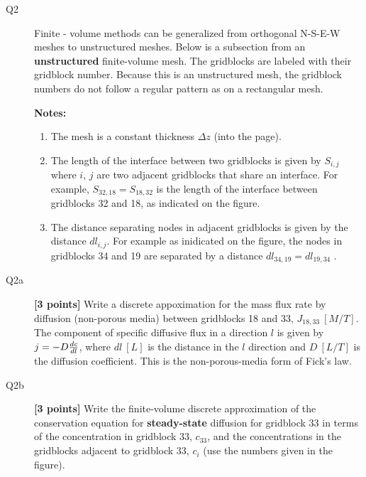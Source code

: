 \documentclass{article}
\begin{document}

\begin{description}
\item [Q2] Finite - volume methods can be generalized from orthogonal N-S-E-W meshes to unstructured meshes. Below is a subsection from an \textbf{unstructured} finite-volume mesh. The gridblocks are labeled with their gridblock number. Because this is an unstructured mesh, the gridblock numbers do not follow a regular pattern as on a rectangular mesh. \par

\item[] \textbf{Notes:}
\begin{enumerate}
\item The mesh is a constant thickness $\Delta z$ (into the page).
\item The length of the interface between two gridblocks is given by $S_{i,j}$ where $i$, $j$ are two adjacent gridblocks that share an interface. For example, $S_{32,18}=S_{18,32}$ is the length of the interface between gridblocks 32 and 18, as indicated on the figure.
\item The distance separating nodes in adjacent gridblocks is given by the distance $dl_{i,j}$. For example as inidicated on the figure, the nodes in gridblocks 34 and 19 are separated by a distance $dl_{34,19}=dl_{19,34}$ .

\end{enumerate}
\item [Q2a] \textbf{[3 points]} Write a discrete appoximation for the mass flux rate by diffusion (non-porous media) between gridblocks 18 and 33, $J_{18,33}~[M/T]$. The component of specific diffusive flux in a direction $l$ is given by $j=-D{dc\over dl}$, where $dl~[L]$ is the distance in the $l$ direction and $D~[L/T]$ is the diffusion coefficient. This is the non-porous-media form of Fick's law.
\vspace{2.0cm}
\item [Q2b] \textbf{[3 points]} Write the finite-volume discrete approximation of the conservation equation for \textbf{steady-state} diffusion for gridblock 33 in terms of the concentration in gridblock 33, $c_{33}$, and the concentrations in the gridblocks adjacent to gridblock 33, $c_i$ (use the numbers given in the figure). 

\end{description}
\end{document}

